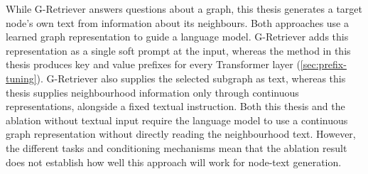 While G-Retriever answers questions about a graph, this thesis generates a target node's own text from information about its neighbours. Both approaches use a learned graph representation to guide a language model. G-Retriever adds this representation as a single soft prompt at the input, whereas the method in this thesis produces key and value prefixes for every Transformer layer (\autoref{sec:prefix-tuning}). G-Retriever also supplies the selected subgraph as text, whereas this thesis supplies neighbourhood information only through continuous representations, alongside a fixed textual instruction. Both this thesis and the ablation without textual input require the language model to use a continuous graph representation without directly reading the neighbourhood text. However, the different tasks and conditioning mechanisms mean that the ablation result does not establish how well this approach will work for node-text generation.
